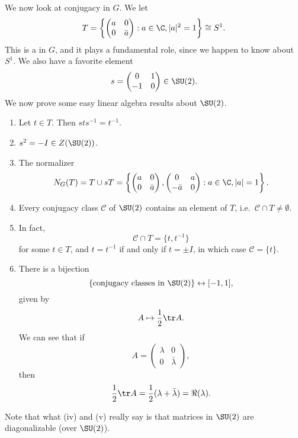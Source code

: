 \documentclass[a4paper]{article}
\begin{document}
We now look at conjugacy in $G$. We let
\[
  T = \left\{
    \begin{pmatrix}
      a & 0\\
      0 & \bar{a}
    \end{pmatrix}: a \in \C, |a|^2 = 1
  \right\} \cong S^1.
\]
This is a  in $G$, and it plays a fundamental role, since we happen to know about $S^1$. We also have a favorite element
\[
  s =
  \begin{pmatrix}
    0 & 1\\
    -1 & 0
  \end{pmatrix} \in \SU(2).
\]
We now prove some easy linear algebra results about $\SU(2)$.
\begin{lemma}\leavevmode
  \begin{enumerate}
    \item Let $t \in T$. Then $sts^{-1} = t^{-1}$.
    \item $s^2 = -I \in Z(\SU(2))$.
    \item The normalizer
      \[
        N_G(T) = T \cup sT =
        \left\{
          \begin{pmatrix}
            a & 0\\
            0 & \bar{a}
          \end{pmatrix},
          \begin{pmatrix}
            0 & a\\
            -\bar{a} & 0
          \end{pmatrix}: a \in \C, |a| = 1\right\}.
      \]
    \item Every conjugacy class $\mathcal{C}$ of $\SU(2)$ contains an element of $T$, i.e.\ $\mathcal{C} \cap T \not= \emptyset$.

    \item In fact,
      \[
        \mathcal{C} \cap T = \{t, t^{-1}\}
      \]
      for some $t \in T$, and $t = t^{-1}$ if and only if $t = \pm I$, in which case $\mathcal{C} = \{t\}$.
    \item There is a bijection
      \[
        \{\text{conjugacy classes in }\SU(2)\} \leftrightarrow [-1, 1],
      \]
      given by
      \[
        A \mapsto \frac{1}{2} \tr A.
      \]
      We can see that if
      \[
        A =
        \begin{pmatrix}
          \lambda & 0\\
          0 & \bar{\lambda}
        \end{pmatrix},
      \]
      then
      \[
        \frac{1}{2}\tr A = \frac{1}{2}(\lambda + \bar{\lambda}) = \Re(\lambda).
      \]
  \end{enumerate}
\end{lemma}
Note that what (iv) and (v) really say is that matrices in $\SU(2)$ are diagonalizable (over $\SU(2)$).
\end{document}
